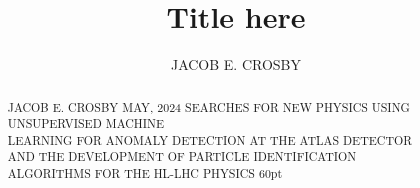 \documentclass[12pt]{osuthesis}
\title{Title here}
\author{JACOB E. CROSBY}
\numberwithin{equation}{section}
\begin{document}
\unboldmath
\maketitle


\begin{acknowledge}
 
\end{acknowledge}


\begin{abstract}
{JACOB E. CROSBY}
{MAY, 2024}
{SEARCHES FOR NEW PHYSICS USING UNSUPERVISED MACHINE \\
LEARNING FOR ANOMALY DETECTION AT THE ATLAS DETECTOR \\
AND THE DEVELOPMENT OF PARTICLE IDENTIFICATION \\
ALGORITHMS FOR THE HL-LHC}
{PHYSICS}
{60pt}
   
\end{abstract}


\renewcommand{\listfigurename}{LIST OF FIGURES}
\renewcommand{\listtablename}{LIST OF TABLES}

{ %


\changepage{-29.43001pt}{}{}{}{}{}{15pt}{12pt}{}
\pagestyle{fancyplain}
\thispagestyle{plain}
\tableofcontents
}

\renewcommand{\cftfigaftersnum}{.}
\renewcommand{\cfttabaftersnum}{.}
\end{document}
